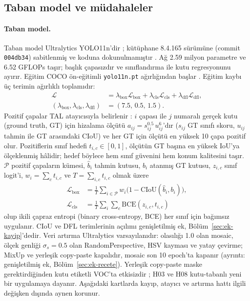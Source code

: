 \documentclass[pdflatex,iicol,sn-mathphys-num]{sn-jnl}
\begin{document}
\subsection{Taban model ve müdahaleler}\label{sec:mudahaleler}\label{sec:baseline-tanim}

\paragraph{Taban model.}
Taban model Ultralytics YOLO11n'dir \cite{jocher_2024_yolo11}; kütüphane 8.4.165 sürümüne (commit \texttt{004db34}) sabitlenmiş ve koduna dokunulmamıştır \cite{ultralytics_2026_v84165}. Ağ 2.59 milyon parametre ve 6.52 GFLOPs taşır; başlık çapasızdır ve sınıflandırma ile kutu regresyonunu ayırır. Eğitim COCO ön-eğitimli \texttt{yolo11n.pt} ağırlığından başlar \cite{lin_2014_coco}. Eğitim kaybı üç terimin ağırlıklı toplamıdır:
\begin{equation}\label{eq:toplam}
\begin{aligned}
\mathcal L&=\lambda_{\mathrm{box}}\mathcal L_{\mathrm{box}}+\lambda_{\mathrm{cls}}\mathcal L_{\mathrm{cls}}+\lambda_{\mathrm{dfl}}\mathcal L_{\mathrm{dfl}},\\
(\lambda_{\mathrm{box}},\lambda_{\mathrm{cls}},\lambda_{\mathrm{dfl}})&=(7.5,\,0.5,\,1.5).
\end{aligned}
\end{equation}
Pozitif çapalar TAL atayıcısıyla belirlenir \cite{feng_2021_tood}: $i$ çapası ile $j$ numaralı gerçek kutu (ground truth, GT) için hizalama ölçütü $a_{ij}=s_{ij}^{0.5}\,u_{ij}^{6}$'dır ($s_{ij}$ GT sınıfı skoru, $u_{ij}$ tahmin ile GT arasındaki CIoU) ve her GT için ölçütü en yüksek 10 çapa pozitif olur. Pozitiflerin sınıf hedefi $t_{i,c}\in[0,1]$, ölçütün GT başına en yüksek IoU'ya ölçeklenmiş hâlidir; hedef böylece hem sınıf güvenini hem konum kalitesini taşır. $\mathcal P$ pozitif çapaların kümesi, $\hat b_i$ tahmin kutusu, $b_i$ atanmış GT kutusu, $z_{i,c}$ sınıf logit'i, $w_i=\sum_c t_{i,c}$ ve $T=\sum_{i,c}t_{i,c}$ olmak üzere
\begin{equation}\label{eq:box}
\begin{aligned}
\mathcal L_{\mathrm{box}}&=\frac1T\sum_{i\in\mathcal P}w_i\bigl(1-\mathrm{CIoU}(\hat b_i,b_i)\bigr),\\
\mathcal L_{\mathrm{cls}}&=\frac1T\sum_{i}\sum_{c}\mathrm{BCE}(z_{i,c},t_{i,c})
\end{aligned}
\end{equation}
olup ikili çapraz entropi (binary cross-entropy, BCE) her sınıf için bağımsız uygulanır. CIoU \cite{zheng_2020_diou} ve DFL \cite{li_2020_gfl} terimlerinin açılımı genişletilmiş ek, Bölüm~\ref{sec:ek-kayip}'dedir. Veri artırma Ultralytics varsayılanıdır: olasılığı 1.0 olan mosaic, ölçek genliği $\sigma_s=0.5$ olan RandomPerspective, HSV kayması ve yatay çevirme; MixUp ve yerleşik copy-paste kapalıdır, mosaic son 10 epoch'ta kapanır (ayrıntı: genişletilmiş ek, Bölüm~\ref{sec:ek-recete}). Yerleşik copy-paste maske gerektirdiğinden kutu etiketli VOC'ta etkisizdir \cite{ultralytics_2026_v84165}; H03 ve H08 kutu-tabanlı yeni bir uygulamaya dayanır. Aşağıdaki kartlarda kayıp, atayıcı ve artırma hattı ilgili değişken dışında aynen korunur.
\end{document}
